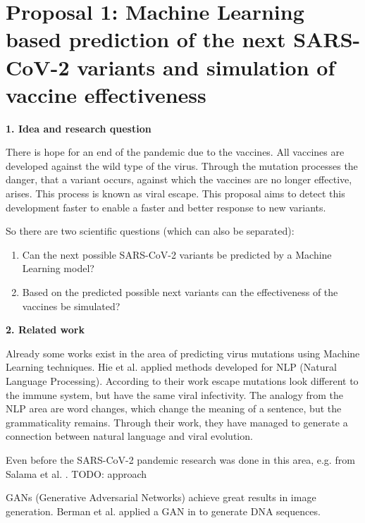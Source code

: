 \section{Proposal 1: Machine Learning based prediction of the next SARS-CoV-2 variants and simulation of vaccine effectiveness}

\textbf{1. Idea and research question}

There is hope for an end of the pandemic due to the vaccines. All vaccines are developed against the wild type of the virus. Through the mutation processes the danger, that a variant occurs, against which the vaccines  are no longer effective, arises. This process is known as viral escape. This proposal aims to detect this development faster to enable a faster and better response to new variants.

So there are two scientific questions (which can also be separated):
\begin{enumerate}
	\item Can the next possible SARS-CoV-2 variants be predicted by a Machine Learning model?
	\item Based on the  predicted possible next variants can the effectiveness of the vaccines be simulated?
\end{enumerate}

\textbf{2. Related work}

Already some works exist in the area of predicting virus mutations using Machine Learning techniques. Hie et al. \cite{Hie284} applied methods developed for NLP (Natural Language Processing).  According to their work escape mutations look different to the immune system, but have the same viral infectivity. The analogy from the NLP area are word changes, which change the meaning of a sentence, but the grammaticality remains. Through their work, they have managed to generate a connection between natural language and viral evolution.

Even before the SARS-CoV-2 pandemic research was done in this area, e.g. from Salama et al. \cite{salamaPredictionVirusMutation2016}. TODO: approach


GANs (Generative Adversarial Networks) achieve great results in image generation. Berman et al. applied a GAN in \cite{berman2020mutagan} to generate DNA sequences.


